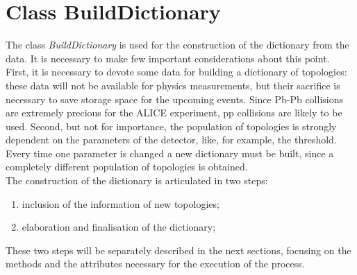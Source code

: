 \section{Class BuildDictionary}
The class \textit{BuildDictionary} is used for the construction of the dictionary from the data. It is necessary to make few important considerations about this point. First, it is necessary to devote some data for building a dictionary of topologies: these data will not be available for physics measurements, but their sacrifice is necessary to save storage space for the upcoming events. Since Pb-Pb collisions are extremely precious for the ALICE experiment, pp collisions are likely to be used. Second, but not for importance, the population of topologies is strongly dependent on the parameters of the detector, like, for example, the threshold. Every time one parameter is changed a new dictionary must be built, since a completely different population of topologies is obtained.\\
The construction of the dictionary is articulated in two steps:
\begin{enumerate}
 \item inclusion of the information of new topologies;
 \item elaboration and finalisation of the dictionary;
\end{enumerate}
These two steps will be separately described in the next sections, focusing on the methods and the attributes necessary for the execution of the process.
